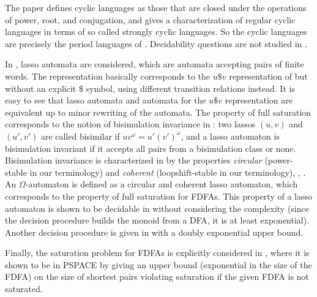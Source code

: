 \documentclass[a4paper,USenglish,cleveref,autoref,thm-restate]{lipics-v2021}
\newcommand{\PSPACE}{\textsf{PSPACE}\xspace}
\begin{document}
The paper \cite{BealCR96} defines cyclic languages as those that are closed under the operations of power, root, and conjugation, and gives a characterization of regular cyclic languages in terms of so called strongly cyclic languages. So the cyclic languages are precisely the period languages of \cite{CalbrixN95}. Decidability questions are not studied in \cite{BealCR96}.

In \cite{CianciaV19}, lasso automata are considered, which are automata accepting pairs of finite words. The representation basically corresponds to the $u\$ v$ representation of \cite{CalbrixNP93} but without an explicit $\$$ symbol, using different transition relations instead.
It is easy to see that lasso automata and automata for the $u\$ v$ representation are equivalent up to minor rewriting of the automata. 
The property of full saturation corresponds to the notion of bisimulation invariance in  \cite{CianciaV19}: two lassos $(u,v)$ and $(u',v')$ are called bisimilar if $uv^\omega = u'(v')^\omega$, and a lasso automaton is bisimulation invariant if it accepts all pairs from a bisimulation class or none.
Bisimulation invariance is characterized in  \cite{CianciaV19} by the properties \textit{circular} (power-stable in our terminology) and \textit{coherent} (loopshift-stable in our terminology), \cite[Theorem 2]{CianciaV12}, \cite[Section 3.3]{CianciaV19}. An $\Omega$-automaton is defined as a circular and coherent lasso automaton, which corresponds to the property of full saturation for FDFAs. This property of a lasso automaton is shown to be decidable in \cite[Theorem 18]{CianciaV19} without considering the complexity (since the decision procedure builds the monoid from a DFA, it is at least exponential). Another decision procedure is given in \cite[Proposition 12]{ChernevHK24} with a doubly exponential upper bound.

Finally, the saturation problem for FDFAs is explicitly considered in \cite[Theorem 4.7]{AngluinBF18}, where it is shown to be in \PSPACE by giving an upper bound (exponential in the size of the FDFA) on the size of shortest pairs violating saturation if the given FDFA is not saturated.
\end{document}
